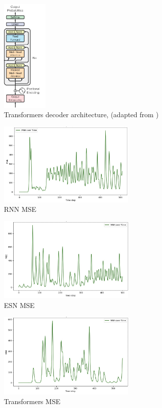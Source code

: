 \documentclass[11pt]{article}
\begin{document}
\begin{figure}[h]
\centering
\includegraphics[width=0.2\textwidth]{decoder.png}
\caption{Transformers decoder architecture, (adapted from \cite{DBLP:journals/corr/VaswaniSPUJGKP17})}
\label{fig:transformer_diagram}
\end{figure}

\begin{figure}[h]
\centering
\includegraphics[width=0.6\textwidth]{rnn_mse.jpeg}
\caption{RNN MSE}
\label{fig:rnn_mse}
\end{figure}

\begin{figure}[h]
\centering
\includegraphics[width=0.6\textwidth]{echo_mse.jpeg}
\caption{ESN MSE}
\label{fig:echo_mse}
\end{figure}

\begin{figure}[h]
\centering
\includegraphics[width=0.6\textwidth]{transformers_mse.jpeg}
\caption{Transformers MSE}
\label{fig:transformers:mse}
\end{figure}

\clearpage


\end{document}
